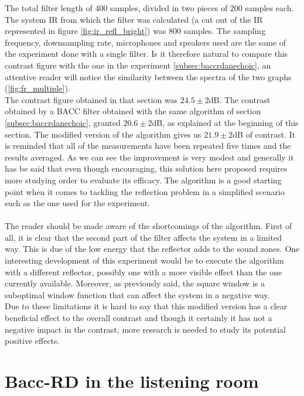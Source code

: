 The total filter length of 400 samples, divided in two pieces of 200 samples each. The system IR from which the filter was calculated (a cut out of the IR represented in figure \ref{fig:ir_refl_bright}) was 800 samples. The sampling frequency, downsampling rate, microphones and speakers used are the same of the experiment done with a single filter. Is it therefore natural to compare this contrast figure with the one in the experiment \ref{subsec:baccrdanechoic}, an attentive reader will notice the similarity between the spectra of the two graphs (\ref{fig:fr_multiple}).
\\
The contrast figure obtained in that section was $24.5\pm2$dB. The contrast obtained by a BACC filter obtained with the same algorithm of section \ref{subsec:baccrdanechoic}, granted $20.6\pm2$dB, as explained at the beginning of this section. The modified version of the algorithm gives us $21.9\pm2$dB of contrast. It is reminded that all of the measurements have been repeated five times and the results averaged. As we can see the improvement is very modest and generally it has be said that even though encouraging, this solution here proposed requires more studying order to evaluate its efficacy. The algorithm is a good starting point when it comes to tackling the reflection problem in a simplified scenario such as the one used for the experiment.
\\
\\
The reader should be made aware of the shortcomings of the algorithm. First of all, it is clear that the second part of the filter affects the system in a limited way. This is due of the low energy that the reflector adds to the sound zones. One interesting development of this experiment would be to execute the algorithm with a different reflector, possibly one with a more visible effect than the one currently available. Moreover, as previously said, the square window is a suboptimal window function that can affect the system in a negative way.
\\
Due to these limitations it is hard to say that this modified version has a clear beneficial effect to the overall contrast and though it certainly it has not a negative impact in the contrast, more research is needed to study its potential positive effects.


\section{Bacc-RD in the listening room}{}
\label{sec:baccrdlisteningroom}


